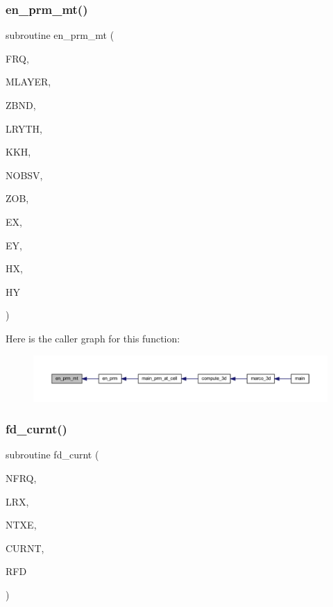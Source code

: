 \subsubsection{\texorpdfstring{en\+\_\+prm\+\_\+mt()}{en\_prm\_mt()}}
{\footnotesize\ttfamily subroutine en\+\_\+prm\+\_\+mt (\begin{DoxyParamCaption}\item[{real}]{F\+RQ,  }\item[{integer}]{M\+L\+A\+Y\+ER,  }\item[{real, dimension(0\+:mlayer)}]{Z\+B\+ND,  }\item[{real, dimension(mlayer)}]{L\+R\+Y\+TH,  }\item[{complex, dimension(0\+:mlayer)}]{K\+KH,  }\item[{integer}]{N\+O\+B\+SV,  }\item[{real}]{Z\+OB,  }\item[{complex}]{EX,  }\item[{complex}]{EY,  }\item[{complex}]{HX,  }\item[{complex}]{HY }\end{DoxyParamCaption})}

Here is the caller graph for this function\+:
\nopagebreak
\begin{figure}[H]
\begin{center}
\leavevmode
\includegraphics[width=350pt]{Marco_8f90_a5cd1810beab2395c64ec9a3873337250_icgraph}
\end{center}
\end{figure}
\mbox{\label{Marco_8f90_a26a547e1b65b547041c0eac9e900a10d}} 
\subsubsection{\texorpdfstring{fd\+\_\+curnt()}{fd\_curnt()}}
{\footnotesize\ttfamily subroutine fd\+\_\+curnt (\begin{DoxyParamCaption}\item[{integer}]{N\+F\+RQ,  }\item[{integer}]{L\+RX,  }\item[{integer}]{N\+T\+XE,  }\item[{real, dimension(nfrq)}]{C\+U\+R\+NT,  }\item[{complex, dimension(nfrq,lrx,ntxe,3)}]{R\+FD }\end{DoxyParamCaption})}

